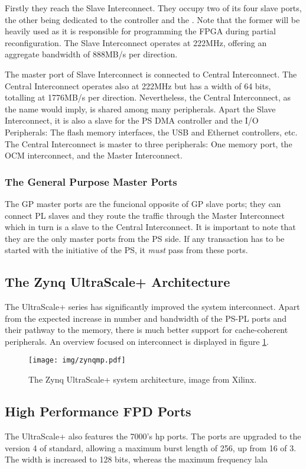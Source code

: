 Firstly they reach the Slave Interconnect. 
They occupy two of its four slave ports,
the other being dedicated to the 
 controller and 
the .
Note that the former will be heavily used as it is responsible
for programming the FPGA during partial reconfiguration.
The Slave Interconnect operates at 222MHz, 
offering an aggregate bandwidth of 888MB/s per direction.

The master port of Slave Interconnect is connected to
Central Interconnect. The Central Interconnect operates
also at 222MHz but has a width of 64 bits, totalling at 1776MB/s
per direction. Nevertheless, the Central Interconnect,
as the name would imply, is shared among many peripherals.
Apart the Slave Interconnect, it is also a slave for the
PS DMA controller and the I/O Peripherals: 
The flash memory interfaces, the USB and Ethernet controllers, etc.
The Central Interconnect is master to three peripherals:
One memory port, the OCM interconnect, and the Master Interconnect.

\subsubsection{The General Purpose Master Ports}

The GP master ports are the funcional opposite of GP slave ports;
they can connect PL slaves and they route the traffic through the
Master Interconnect which in turn is a slave to the Central Interconnect.
It is important to note that they are the only master ports from the PS side.
If any transaction has to be started with the initiative of the PS,
it \emph{must} pass from these ports.

\subsection{The Zynq UltraScale+ Architecture}

The UltraScale+ series has significantly improved the system interconnect.
Apart from the expected increase in number and bandwidth of the
PS-PL ports and their pathway to the memory, there is much better support
for cache-coherent peripherals. An overview focused on interconnect
is displayed in figure \ref{fig:zynqmp-block}.

\begin{figure}[htbp]
  \centering
  \captionsetup{justification=centering,margin=0cm}
  \texttt{[image: img/zynqmp.pdf]}
  \caption{The Zynq UltraScale+ system architecture, image from Xilinx\cite{ug1085}.}
  \label{fig:zynqmp-block}
\end{figure}


\subsection{High Performance FPD Ports}
The UltraScale+ also features the 7000's \gls{hp} ports. 
The ports are upgraded to the version 4 of  standard, allowing a maximum burst length
of 256, up from 16 of 3. The width is increased to 128 bits, whereas the maximum
frequency  lala

\label{sect:interconnect}

